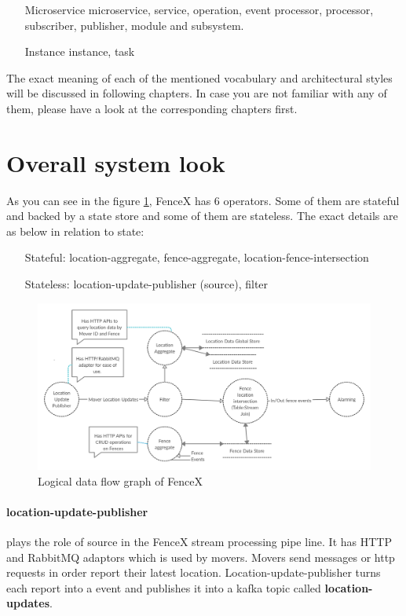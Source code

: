\documentclass[a4]{report}
\begin{document}
    \begin{itemize}
        \item[Microservice] microservice, service, operation, event processor,  processor, subscriber, publisher, module and subsystem.
        \item[Instance] instance, task
    \end{itemize}

    The exact meaning of each of the mentioned vocabulary and architectural styles will be discussed in following
    chapters.
    In case you are not familiar with any of them, please have a look at the corresponding chapters first.


    \section{Overall system look}
    As you can see in the figure \ref{fig:logical-dfg}, FenceX has 6 operators.
    Some of them are stateful and backed by a state store and some of them are stateless.
    The exact details are as below in relation to state:

    \begin{itemize}
        \item[Stateful:] location-aggregate, fence-aggregate, location-fence-intersection
        \item[Stateless:] location-update-publisher (source), filter
    \end{itemize}

    \begin{figure}[ht]
        \caption{Logical data flow graph of FenceX}
        \label{fig:logical-dfg}
        \includegraphics[scale=0.2]{images/logical-data-flow-diagram.png}
    \end{figure}

    \paragraph{location-update-publisher} plays the role of source in the FenceX stream processing pipe line.
    It has HTTP and RabbitMQ adaptors which is used by movers.
    Movers send messages or http requests in order report their latest location.
    Location-update-publisher turns each report into a event and publishes it into a kafka topic called \textbf{location-updates}.
\end{document}

